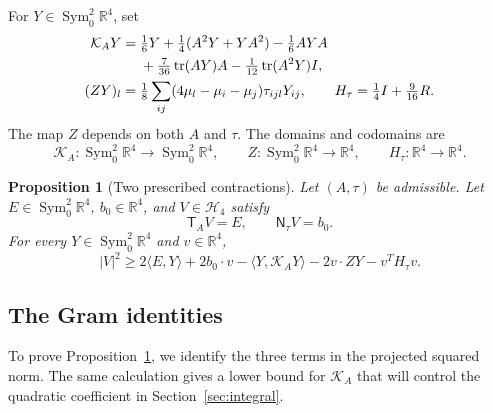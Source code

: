 \documentclass[11pt,a4paper]{amsart}
\numberwithin{equation}{section}
\newtheorem{proposition}[theorem]{Proposition}
\theoremstyle{definition}
\theoremstyle{remark}
\DeclareMathOperator{\tr}{tr}
\newcommand{\R}{\mathbb R}
\newcommand{\K}{\mathcal K}
\newcommand{\T}{\mathsf T}
\newcommand{\N}{\mathsf N}
\newcommand{\Szero}{\operatorname{Sym}^2_0\R^4}
\newcommand{\Hfour}{\mathscr H_4}
\begin{document}
For $Y\in\Szero$, set
\begin{align}
 \K_AY={}&\tfrac16Y+\tfrac14(A^2Y+YA^2)-\tfrac16AYA
 \notag\\
 &+\tfrac7{36}\tr(AY)A-\tfrac1{12}\tr(A^2Y)I,\label{eq:K}\\
 (ZY)_l={}&\tfrac18\sum_{ij}(4\mu_l-\mu_i-\mu_j)\tau_{ijl}Y_{ij},
 \qquad H_\tau=\tfrac14I+\tfrac9{16}R.\label{eq:ZH}
\end{align}
The map $Z$ depends on both $A$ and $\tau$. The domains and codomains are
\[
 \K_A:\Szero\to\Szero,\qquad
 Z:\Szero\to\R^4,\qquad H_\tau:\R^4\to\R^4.
\]

\begin{proposition}[Two prescribed contractions]\label{prop:joint}
Let $(A,\tau)$ be admissible. Let $E\in\Szero$, $b_0\in\R^4$,
and $V\in\Hfour$ satisfy
\[
 \T_AV=E,\qquad \N_\tau V=b_0.
\]
For every $Y\in\Szero$ and $v\in\R^4$,
\begin{equation}\label{eq:joint}
 |V|^2\ge2\langle E,Y\rangle+2b_0\cdot v
 -\langle Y,\K_AY\rangle-2v\cdot ZY-v^TH_\tau v.
\end{equation}
\end{proposition}

\subsection{The Gram identities}
To prove Proposition~\ref{prop:joint}, we identify the three terms
in the projected squared norm. The same calculation gives a lower
bound for $\K_A$ that will control the quadratic coefficient in
Section~\ref{sec:integral}.
\end{document}

